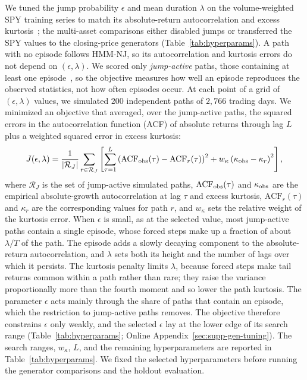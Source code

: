 We tuned the jump probability $\epsilon$ and mean duration $\lambda$
on the volume-weighted SPY training series to match its absolute-return autocorrelation and excess
kurtosis~\cite{mandelbrot1963, cont2001, rydenTerasvirtaAsbrink1998};
the multi-asset comparisons either disabled jumps or transferred the
SPY values to the closing-price generators
(Table~\ref{tab:hyperparams}). A path with no episode follows HMM-NJ, so its autocorrelation and
kurtosis errors do not depend on $(\epsilon,\lambda)$. We scored only \emph{jump-active} paths, those containing at least one
episode~\cite{glasserman2003}, so the objective measures how well an
episode reproduces the observed statistics, not how often episodes
occur. At each point of a grid of
$(\epsilon,\lambda)$ values, we simulated $200$ independent paths of
$2{,}766$ trading days. We minimized an objective that averaged, over
the jump-active paths, the squared errors in the autocorrelation
function (ACF) of absolute returns through lag $L$ plus a weighted
squared error in excess kurtosis:
\begin{equation}
    J(\epsilon, \lambda) =
    \frac{1}{|\mathcal{R}_J|}\sum_{r\in\mathcal{R}_J}
    \left[
    \sum_{\tau=1}^{L} \left( \mathrm{ACF}_{\rm obs}(\tau)
    - \mathrm{ACF}_{r}(\tau) \right)^2
    + w_\kappa \left( \kappa_{\rm obs} - \kappa_{r} \right)^2
    \right],
    \label{eq:grid_search}
\end{equation}
where $\mathcal{R}_J$ is the set of jump-active simulated paths,
$\mathrm{ACF}_{\rm obs}(\tau)$ and $\kappa_{\rm obs}$ are the empirical
absolute-growth autocorrelation at lag $\tau$ and excess kurtosis,
$\mathrm{ACF}_{r}(\tau)$ and $\kappa_r$ are the corresponding values
for path $r$, and $w_\kappa$ sets the relative weight of the kurtosis
error. When $\epsilon$ is small, as at the selected value, most
jump-active paths contain a single episode, whose forced
steps make up a fraction of about $\lambda/T$ of the path. The episode
adds a slowly decaying component to the absolute-return
autocorrelation, and $\lambda$ sets both its height and the number of
lags over which it persists. The kurtosis penalty limits $\lambda$, because forced steps make tail
returns common within a path rather than rare; they raise the variance
proportionally more than the fourth moment and so lower the path
kurtosis. The parameter $\epsilon$ acts mainly through the share
of paths that contain an episode, which the restriction to jump-active paths removes. The objective
therefore constrains $\epsilon$ only weakly, and the selected
$\epsilon$ lay at the lower edge of its search range
(Table~\ref{tab:hyperparams}; Online
Appendix~\ref{sec:supp-gen-tuning}).
The search ranges, $w_\kappa$, $L$, and the remaining hyperparameters
are reported in Table~\ref{tab:hyperparams}. We fixed the selected
hyperparameters before running the generator comparisons and the
holdout evaluation.

